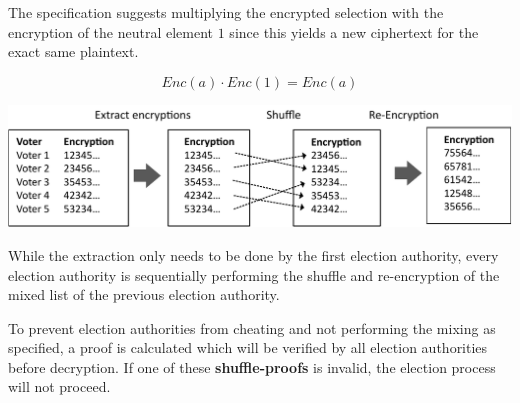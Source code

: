 The specification suggests multiplying the encrypted selection with the encryption of the neutral element $1$ since this yields a new ciphertext for the exact same plaintext.

\begin{equation*}Enc(a) \cdot Enc(1) = Enc(a)\end{equation*}

\begin{center}
\includegraphics[scale=0.95]{assets/mixing.pdf}
\label{During the mixing}
\end{center}

While the extraction only needs to be done by the first election authority, every election authority is sequentially performing the shuffle and re-encryption of the mixed list of the previous election authority.

To prevent election authorities from cheating and not performing the mixing as specified, a proof is calculated which will be verified by all election authorities before decryption. If one of these \textbf{shuffle-proofs} is invalid, the election process will not proceed.
